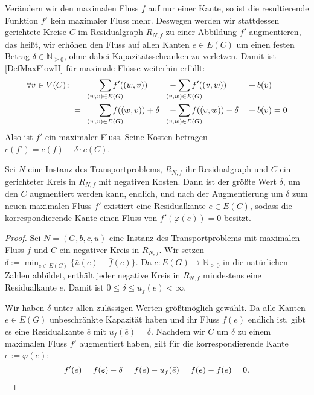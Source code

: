 Verändern wir den maximalen Fluss $f$ auf nur einer Kante, so ist die resultierende Funktion $f'$ kein maximaler Fluss mehr. Deswegen werden wir stattdessen gerichtete Kreise $C$ im Residualgraph $R_{N,f}$ zu einer Abbildung $f'$ augmentieren, das heißt, wir erhöhen den Fluss auf allen Kanten $e\in E(C)$ um einen festen Betrag $\delta\in\mathbb{N}_{\geq0}$, ohne dabei Kapazitätsschranken zu verletzen. Damit ist \cref{DefMaxFlowII} für maximale Flüsse weiterhin erfüllt:
\begin{alignat*}{4}
\forall v\in V(C)\colon&&&\sum_{\mathclap{(w,v)\in E(G)}} f'((w,v)) &&-\sum_{\mathclap{(v,w)\in E(G)}} f'((v,w)) &&+ b(v)\\
&=\quad&&\sum_{\mathclap{(w,v)\in E(G)}} f((w,v)) + \delta &&-\sum_{\mathclap{(v,w)\in E(G)}} f((v,w)) - \delta &&+ b(v) = 0\end{alignat*}
Also ist $f'$ ein maximaler Fluss. Seine Kosten betragen $c(f')=c(f) + \delta\cdot c(C)$.

\begin{lem}\label{negKreis}Sei $N$ eine Instanz des Transportproblems, $R_{N,f}$ ihr Residualgraph und $C$ ein gerichteter Kreis in $R_{N,f}$ mit negativen Kosten. Dann ist der größte Wert $\delta$, um den $C$ augmentiert werden kann, endlich, und nach der Augmentierung um $\delta$ zum neuen maximalen Fluss $f'$ existiert eine Residualkante $\bar{e}\in E(C)$, sodass die korrespondierende Kante einen Fluss von $f'(\varphi(\bar{e}))=0$ besitzt. 
\end{lem}
\begin{proof}Sei $N=(G,b,c,u)$ eine Instanz des Transportproblems mit maximalen Fluss $f$ und $C$ ein negativer Kreis in $R_{N,f}$. Wir setzen $\delta:=\min_{e\in E(C)}\{\bar{u}(e)-\bar{f}(e)\}$. Da $c\colon E(G)\rightarrow\mathbb{N}_{\geq0}$ in die natürlichen Zahlen abbildet, enthält jeder negative Kreis in $R_{N,f}$ mindestens eine Residualkante $\bar{e}$. Damit ist $0\leq\delta\leq u_f(\bar{e})<\infty$.

Wir haben $\delta$ unter allen zulässigen Werten größtmöglich gewählt. Da alle Kanten $e\in E(G)$ unbeschränkte Kapazität haben und ihr Fluss $f(e)$ endlich ist, gibt es eine Residualkante $\bar{e}$ mit $u_f(\bar{e})=\delta$. Nachdem wir $C$ um $\delta$ zu einem maximalen Fluss $f'$ augmentiert haben, gilt für die korrespondierende Kante $e:=\varphi(\bar{e})$:
\begin{equation*}
f'(e)=f(e)-\delta=f(e)-u_f(\bar{e})=f(e)-f(e)=0.\qedhere
\end{equation*}\end{proof}

